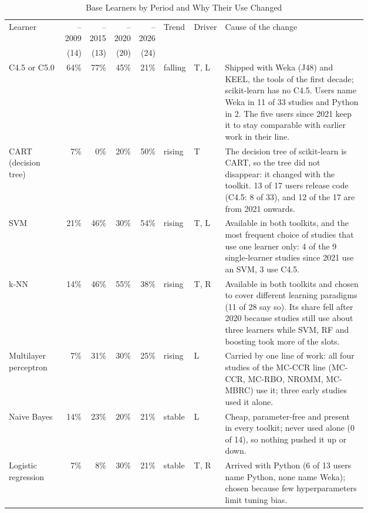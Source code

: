 \begin{table}[p]
  \caption{Base Learners by Period and Why Their Use Changed}
  \label{tab:empirical-learner-causes}
  \footnotesize
  \setlength{\tabcolsep}{3pt}
  \begin{tabular}{@{}p{0.16\linewidth}rrrrp{0.07\linewidth}p{0.06\linewidth}p{0.42\linewidth}@{}}
    \toprule
    Learner & --2009 & --2015 & --2020 & --2026 & Trend & Driver & Cause of the change\\
    & (14) & (13) & (20) & (24) & & & \\
    \midrule
    C4.5 or C5.0 & 64\% & 77\% & 45\% & 21\% & falling & T, L & Shipped with Weka (J48) and KEEL, the tools of the first decade; scikit-learn has no C4.5. Users name Weka in 11 of 33 studies and Python in 2. The five users since 2021 keep it to stay comparable with earlier work in their line.\\
    CART (decision tree) & 7\% & 0\% & 20\% & 50\% & rising & T & The decision tree of scikit-learn is CART, so the tree did not disappear: it changed with the toolkit. 13 of 17 users release code (C4.5: 8 of 33), and 12 of the 17 are from 2021 onwards.\\
    SVM & 21\% & 46\% & 30\% & 54\% & rising & T, L & Available in both toolkits, and the most frequent choice of studies that use one learner only: 4 of the 9 single-learner studies since 2021 use an SVM, 3 use C4.5.\\
    k-NN & 14\% & 46\% & 55\% & 38\% & rising & T, R & Available in both toolkits and chosen to cover different learning paradigms (11 of 28 say so). Its share fell after 2020 because studies still use about three learners while SVM, RF and boosting took more of the slots.\\
    Multilayer perceptron & 7\% & 31\% & 30\% & 25\% & rising & L & Carried by one line of work: all four studies of the MC-CCR line (MC-CCR, MC-RBO, NROMM, MC-MBRC) use it; three early studies used it alone.\\
    Naive Bayes & 14\% & 23\% & 20\% & 21\% & stable & L & Cheap, parameter-free and present in every toolkit; never used alone (0 of 14), so nothing pushed it up or down.\\
    Logistic regression & 7\% & 8\% & 30\% & 21\% & stable & T, R & Arrived with Python (6 of 13 users name Python, none name Weka); chosen because few hyperparameters limit tuning bias.\\

\end{tabular}
\end{table}
